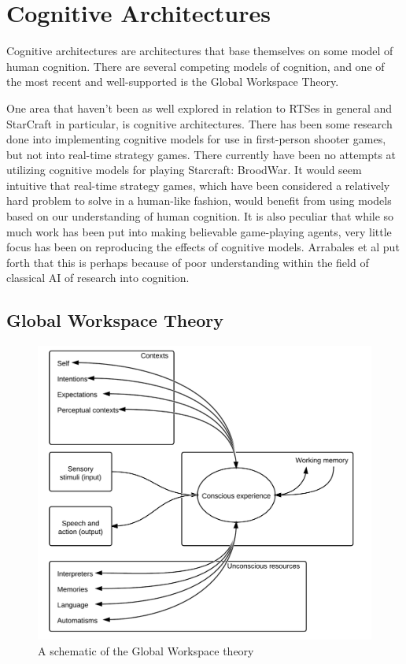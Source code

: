 \section{Cognitive Architectures}
Cognitive architectures are architectures that base themselves on some model of
human cognition. There are several competing models of cognition, and one of
the most recent and well-supported is the Global Workspace Theory.

One area that haven't been as well explored in relation to RTSes in general and
StarCraft in particular, is cognitive architectures.
There has been some research done into implementing cognitive models for use in
first-person shooter games, but not into real-time strategy games. There
currently have been no attempts at utilizing cognitive models for playing
Starcraft: BroodWar. It would seem intuitive that real-time strategy games,
which have been considered a relatively hard problem to solve in a human-like
fashion, would benefit from using models based on our understanding of human
cognition. It is also peculiar that while so much work has been put into making
believable game-playing agents, very little focus has been on reproducing the
effects of cognitive models.  Arrabales et al put forth that this is perhaps
because of poor understanding within the field of classical AI of research into
cognition\cite{arrabales2009gamechars}.

\subsection{Global Workspace Theory}

\begin{figure}[h!tb]
\centering
\includegraphics[scale=1.0]{graphics/globalworkspace.png}
\caption{A schematic of the Global Workspace theory\cite{baars2005gwt}}
\label{fig:gwt}
\end{figure}

